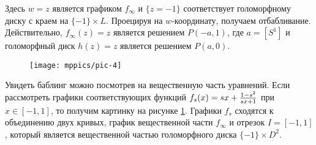 Здесь $w = z$ является графиком $f_\infty$ и $\{z = -1\}$ соответствует голоморфному диску с краем на $\{-1\} \times L$.
Проецируя на $w$-координату, получаем отбабливание.
Действительно, $f_\infty (z) = z$ является решением $P (-a, 1)$, где $a = [S^1]$ и голоморфный диск $h (z) = z$ является решением $P (a, 0)$.

\begin{figure}[ht!]
\vskip-0mm
\centering
\texttt{[image: mppics/pic-4]}
\caption{}\label{pic-4}
\vskip0mm
\end{figure}

Увидеть баблинг можно посмотрев на вещественную часть уравнений.
Если рассмотреть графики соответствующих функций
$f_s(x)\z=sx+\frac{1-s^2}{sx+1}$ при $x \in [-1, 1]$, 
то получим картинку на рисунке \ref{pic-4}. 
Графики $f_s$ сходятся к объединению двух кривых, график вещественной
части $f_\infty$ и отрезок $I = [-1, 1]$, который является
вещественной частью голоморфного диска $\{-1\} \times D^2$.  
